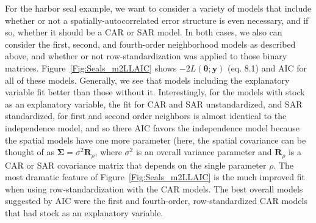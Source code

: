 \documentclass[12pt, titlepage]{article}
\begin{document}
For the harbor seal example, we want to consider a variety of models that include whether or not a spatially-autocorrelated error structure is even necessary, and if so, whether it should be a CAR or SAR model.  In both cases, we also can consider the first, second, and fourth-order neighborhood models as described above, and whether or not row-standardization was applied to those binary matrices. Figure~\ref{Fig:Seals_m2LLAIC} shows $-2L(\boldsymbol{\theta};\mathbf{y})$ (eq. 8.1) and AIC for all of these models.  Generally, we see that models including the explanatory variable fit better than those without it.  Interestingly, for the models with stock as an explanatory variable, the fit for CAR and SAR unstandardized, and SAR standardized, for first and second order neighbors is almost identical to the independence model, and so there AIC favors the independence model because the spatial models have one more parameter (here, the spatial covariance can be thought of as $\boldsymbol{\Sigma} = \sigma^{2}\mathbf{R}_{\rho}$, where $\sigma^{2}$ is an overall variance parameter and $\mathbf{R}_{\rho}$ is a CAR or SAR covariance matrix that depends on the single parameter $\rho$.  The most dramatic feature of Figure~\ref{Fig:Seals_m2LLAIC} is the much improved fit when using row-standardization with the CAR models.  The best overall models suggested by AIC were the first and fourth-order, row-standardized CAR models that had stock as an explanatory variable.
\end{document}
